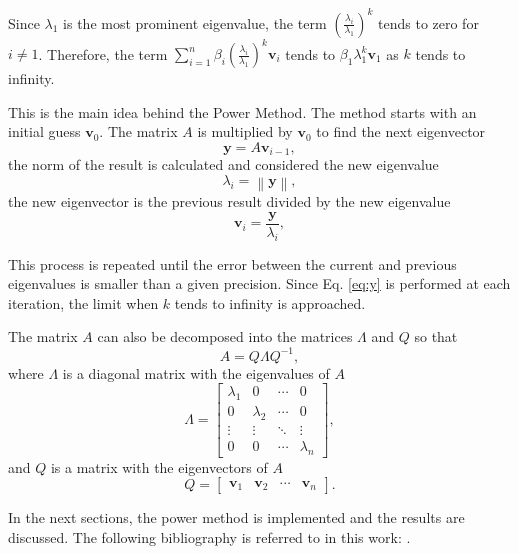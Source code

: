 Since $\lambda_1$ is the most prominent eigenvalue, the term $\left(\frac{\lambda_i}{\lambda_1}\right)^k$ tends to zero for $i \neq 1$. Therefore, the term $\sum_{i=1}^{n}\beta_i\left(\frac{\lambda_i}{\lambda_1}\right)^k\mathbf{v}_i$ tends to $\beta_1\lambda_1^k\mathbf{v}_1$ as $k$ tends to infinity. 

This is the main idea behind the Power Method. The method starts with an initial guess $\mathbf{v}_0$. The matrix $A$ is multiplied by $\mathbf{v}_0$ to find the next eigenvector
\begin{equation}
    \mathbf{y} = A\mathbf{v}_{i-1},
    \label{eq:y}
\end{equation}
the norm of the result is calculated and considered the new eigenvalue
\begin{equation}
    \lambda_i = \left\|\mathbf{y}\right\|,
\end{equation}
the new eigenvector is the previous result divided by the new eigenvalue
\begin{equation}
    \mathbf{v}_i = \frac{\mathbf{y}}{\lambda_i},
\end{equation}

This process is repeated until the error between the current and previous eigenvalues is smaller than a given precision. Since Eq. \eqref{eq:y} is performed at each iteration, the limit when $k$ tends to infinity is approached.

The matrix $A$ can also be decomposed into the matrices $\Lambda$ and $Q$ so that
\begin{equation}
    A = Q\Lambda Q^{-1},
    \label{eq:decomposition}
\end{equation}
where $\Lambda$ is a diagonal matrix with the eigenvalues of $A$ 
\begin{equation*}
    \Lambda = \begin{bmatrix}
        \lambda_1 & 0 & \cdots & 0 \\
        0 & \lambda_2 & \cdots & 0 \\
        \vdots & \vdots & \ddots & \vdots \\
        0 & 0 & \cdots & \lambda_n
    \end{bmatrix},
\end{equation*}
and $Q$ is a matrix with the eigenvectors of $A$
\begin{equation*}
    Q = \begin{bmatrix}
        \mathbf{v}_1 & \mathbf{v}_2 & \cdots & \mathbf{v}_n
    \end{bmatrix}.
\end{equation*}

In the next sections, the power method is implemented and the results are discussed. The following bibliography is referred to in this work: \cite{de2000metodos,burden1997numerical}.